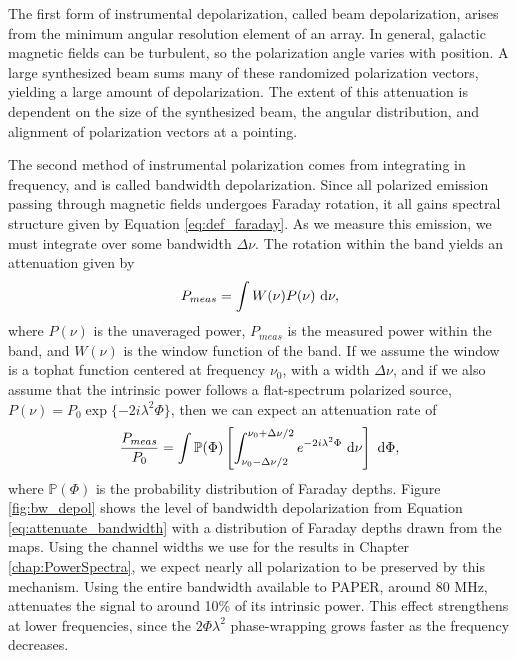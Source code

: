 The first form of instrumental depolarization, called beam depolarization, arises from the minimum
angular resolution element of an array. In general, galactic magnetic fields can be turbulent, so
the polarization angle varies with position. A large synthesized beam sums many of these randomized
polarization vectors, yielding a large amount of depolarization. The extent of this attenuation is
dependent on the size of the synthesized beam, the angular distribution, and alignment of polarization
vectors at a pointing.

The second method of instrumental polarization comes from integrating in frequency, and is called
bandwidth depolarization. Since all polarized emission passing through magnetic fields undergoes
Faraday rotation, it all gains spectral structure given by Equation \ref{eq:def_faraday}. As we
measure this emission, we must integrate over some bandwidth $\Delta\nu$. The rotation within the
band yields an attenuation given by
\begin{equation}
  P_{meas} = \int W(\nu)P(\nu)\ \mathrm{d}\nu,
\end{equation}
where $P(\nu)$ is the unaveraged power, $P_{meas}$ is the measured power within the band, and
$W(\nu)$ is the window function of the band. If
we assume the window is a tophat function centered at frequency $\nu_0$, with a width $\Delta\nu$,
and if we also assume that the intrinsic power follows a flat-spectrum polarized source, $P(\nu) =
P_0\exp\{-2i\lambda^2\Phi\}$, then we can expect an attenuation rate of 
\begin{equation}
  \frac{P_{meas}}{P_0} =
  \int \mathbb{P}(\Phi)
  \left[\int_{\nu_0-\Delta\nu/2}^{\nu_0+\Delta\nu/2}e^{-2i\lambda^2\Phi}\ \mathrm{d}\nu\right]
  \ \mathrm{d}\Phi,
  \label{eq:attenuate_bandwidth}
\end{equation}
where $\mathbb{P}(\Phi)$ is the probability distribution of Faraday depths. Figure
\ref{fig:bw_depol} shows the level of bandwidth depolarization from Equation
\ref{eq:attenuate_bandwidth} with a distribution of Faraday depths drawn from the
\citet{Oppermann2012} maps. Using the channel widths we use for the results in Chapter
\ref{chap:PowerSpectra}, we expect nearly all polarization to be preserved by this mechanism. Using the
entire bandwidth available to PAPER, around 80 MHz, attenuates the signal to around 10\% of its
intrinsic power. This effect strengthens at lower frequencies, since the $2\Phi\lambda^2$ phase-wrapping
grows faster as the frequency decreases. 

